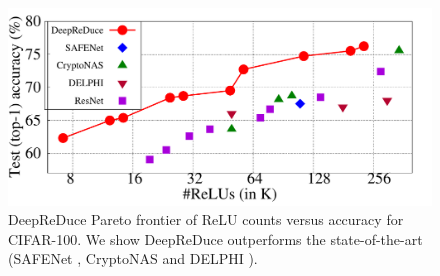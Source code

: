 \begin{figure}[t] \centering
\includegraphics[scale=0.45]{Figures/ParetoFrontier}
\vspace{-2em}
\caption{DeepReDuce Pareto frontier of ReLU counts versus accuracy for CIFAR-100.
We show DeepReDuce outperforms
the state-of-the-art (SAFENet \cite{lou2021safenet}, CryptoNAS \cite{ghodsi2020cryptonas} and DELPHI \cite{mishra2020delphi}).}
\vspace{-2em}
\label{fig:ParetoFrontier}
\end{figure}
